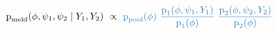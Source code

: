 \begin{equation*}
  \pd_{\text{meld}} (\phi, \psi_{1}, \psi_{2} \mid Y_{1}, Y_{2}) \,\, \propto \,\,
  \textcolor{mymidblue}{ 
    \ppoolphi \,\,
    \frac {
      \pd_{1}(\phi, \psi_{1}, Y_{1})
    } {
      \pd_{1}(\phi)
    }
    \,\,
    \frac {
      \pd_{2}(\phi, \psi_{2}, Y_{2})
    } {
      \pd_{2}(\phi)
    }
  }
\end{equation*}